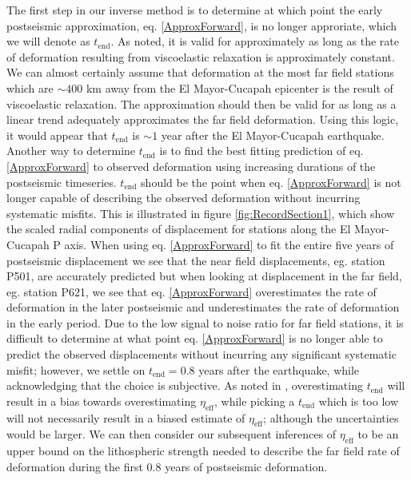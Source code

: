 \documentclass[1p]{elsarticle}
\begin{document}
The first step in our inverse method is to determine at which point the early postseismic approximation, eq. \ref{ApproxForward}, is no longer approriate, which we will denote as $t_{\mathrm{end}}$.  As noted, it is valid for approximately as long as the rate of deformation resulting from viscoelastic relaxation is approximately constant. We can almost certainly assume that deformation at the most far field stations which are $\sim400$ km away from the El Mayor-Cucapah epicenter is the result of viscoelastic relaxation. The approximation should then be valid for as long as a linear trend adequately approximates the far field deformation. Using this logic, it would appear that $t_{\mathrm{end}}$ is $\sim1$ year after the El Mayor-Cucapah earthquake.  Another way to determine $t_{\mathrm{end}}$ is to find the best fitting prediction of eq. \ref{ApproxForward} to observed deformation using increasing durations of the postseismic timeseries.  $t_\mathrm{end}$ should be the point when eq. \ref{ApproxForward} is not longer capable of describing the observed deformation without incurring systematic misfits.  This is illustrated in figure \ref{fig:RecordSection1}, which show the scaled radial components of displacement for stations along the El Mayor-Cucapah P axis.  When using eq. \ref{ApproxForward} to fit the entire five years of postseismic displacement we see that the near field displacements, eg. station P501, are accurately predicted but when looking at displacement in the far field, eg. station P621, we see that eq. \ref{ApproxForward} overestimates the rate of deformation in the later postseismic and underestimates the rate of deformation in the early period.  Due to the low signal to noise ratio for far field stations, it is difficult to determine at what point eq. \ref{ApproxForward} is no longer able to predict the observed displacements without incurring any significant systematic misfit; however, we settle on $t_{\mathrm{end}}=0.8$ years after the earthquake, while acknowledging that the choice is subjective. As noted in \cite{Hines2015}, overestimating $t_{\mathrm{end}}$ will result in a bias towards overestimating $\eta_{\mathrm{eff}}$, while picking a $t_\mathrm{end}$ which is too low will not necessarily result in a biased estimate of $\eta_\mathrm{eff}$; although the uncertainties would be larger. We can then consider our subsequent inferences of $\eta_{\mathrm{eff}}$ to be an upper bound on the lithospheric strength needed to describe the far field rate of deformation during the first 0.8 years of postseismic deformation. 
\end{document}
